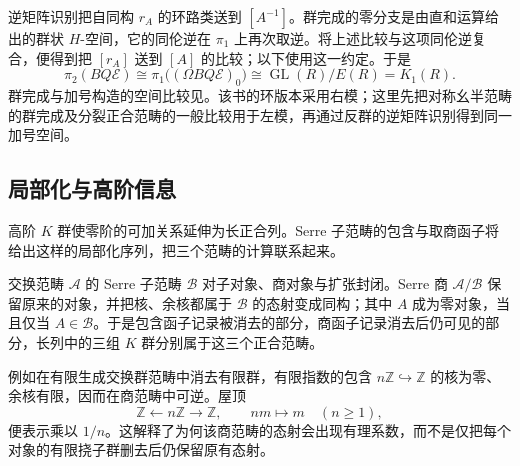 \begin{proofsketch}
	逆矩阵识别把自同构 \(r_A\) 的环路类送到 \([A^{-1}]\)。群完成的零分支是由直和运算给出的群状 \(H\)-空间，它的同伦逆在 \(\pi_1\) 上再次取逆。将上述比较与这项同伦逆复合，便得到把 \([r_A]\) 送到 \([A]\) 的比较；以下使用这一约定。于是
	\[
		\pi_2(BQ\mathcal E)\cong\pi_1\bigl((\Omega BQ\mathcal E)_0\bigr) \cong\operatorname{GL}(R)/E(R)=K_1(R).
	\]
	群完成与加号构造的空间比较见\cite[Chapter IV, Theorems 4.10 and 7.1; Corollary 7.2; Exercise 7.9]{Weibel2013KBook}。该书的环版本采用右模；这里先把对称幺半范畴的群完成及分裂正合范畴的一般比较用于左模，再通过反群的逆矩阵识别得到同一加号空间。
\end{proofsketch}

\subsection{局部化与高阶信息}
\label{b4:subsec:B03:03}

高阶 \(K\) 群使零阶的可加关系延伸为长正合列。Serre 子范畴的包含与取商函子将给出这样的局部化序列，把三个范畴的计算联系起来。

\ProseParagraphBreak
交换范畴 \(\mathcal A\) 的 Serre 子范畴 \(\mathcal B\) 对子对象、商对象与扩张封闭。Serre 商 \(\mathcal A/\mathcal B\) 保留原来的对象，并把核、余核都属于 \(\mathcal B\) 的态射变成同构；其中 \(A\) 成为零对象，当且仅当 \(A\in\mathcal B\)。于是包含函子记录被消去的部分，商函子记录消去后仍可见的部分，长列中的三组 \(K\) 群分别属于这三个正合范畴。

\ProseParagraphBreak
例如在有限生成交换群范畴中消去有限群，有限指数的包含 \(n\mathbb Z\hookrightarrow\mathbb Z\) 的核为零、余核有限，因而在商范畴中可逆。屋顶
\[
	\mathbb Z\longleftarrow n\mathbb Z\longrightarrow\mathbb Z, \qquad nm\longmapsto m\quad(n\ge1),
\]
便表示乘以 \(1/n\)。这解释了为何该商范畴的态射会出现有理系数，而不是仅把每个对象的有限挠子群删去后仍保留原有态射。

